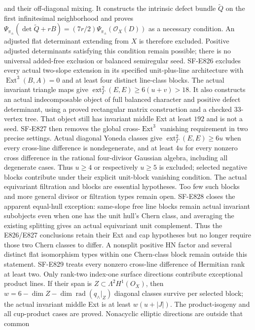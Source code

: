 \documentclass[11pt]{article}
\theoremstyle{remark}\newtheorem{remark}[theorem]{Remark}
\begin{document}
and their off-diagonal mixing. It constructs the intrinsic defect bundle
$\widetilde Q$ on the first infinitesimal neighborhood and proves
$\Psi_{\pi_\pm}(\det\widetilde Q+rB)
=(7r/2)\Psi_{\pi_\pm}(\mathcal O_X(D))$ as a necessary condition.
An adjusted flat determinant extending from $X$ is therefore excluded.
Positive adjusted determinants satisfying this condition remain possible;
there is no universal added-free exclusion or balanced semiregular seed.
SF-E826 excludes every actual two-slope extension in its specified
unit-plus-line architecture with $\operatorname{Ext}^3(B,A)=0$
and at least four distinct line-class blocks. The actual invariant
triangle maps give $\operatorname{ext}^2_\Gamma(E,E)\ge6(u+v)>18$.
It also constructs an actual indecomposable object of full balanced
character and positive defect determinant, using a proved rectangular
matrix construction and a checked 33-vertex tree. That object still
has invariant middle Ext at least $192$ and is not a seed.
SF-E827 then removes the global cross-$\operatorname{Ext}^3$
vanishing requirement in two precise settings. Actual diagonal Yoneda
classes give $\operatorname{ext}^2_\Gamma(E,E)\ge6u$ when every
cross-line difference is nondegenerate, and at least $4u$ for every
nonzero cross difference in the rational four-divisor Gaussian algebra,
including all degenerate cases. Thus $u\ge4$ or respectively $u\ge5$
is excluded; selected negative blocks contribute under their explicit
unit-block vanishing condition. The actual equivariant filtration and
blocks are essential hypotheses. Too few such blocks and more general
divisor or filtration types remain open.
SF-E828 closes the apparent equal-hull exception: same-slope free
line blocks remain actual invariant subobjects even when one has the
unit hull's Chern class, and averaging the existing splitting gives
an actual equivariant unit complement. Thus the E826/E827 conclusions
retain their Ext and cap hypotheses but no longer require those two
Chern classes to differ. A nonsplit positive HN factor and several
distinct flat isomorphism types within one Chern-class block remain
outside this statement.
SF-E829 treats every nonzero cross-line difference of Hermitian rank
at least two. Only rank-two index-one surface directions contribute
exceptional product lines. If their span is $Z\subset\Lambda^2H^1(O_X)$,
then $w=6-\dim Z-\dim\operatorname{rad}(q_\wedge|_Z)$ diagonal
classes survive per selected block; the actual invariant middle Ext
is at least $w(u+|J|)$. The product-isogeny and all cup-product cases
are proved. Nonacyclic elliptic directions are outside that common
\end{document}

